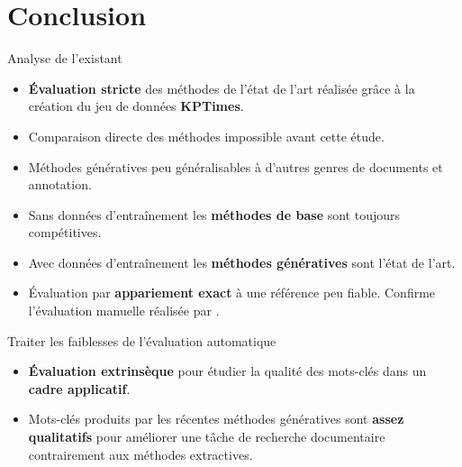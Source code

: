 \section*{Conclusion}

\begin{frame}{}
    \sectionpage
\end{frame}

\begin{frame}{Analyse de l'existant}
    \begin{itemize}
        \item \textbf{\'Evaluation stricte} des méthodes de l'état de l'art réalisée grâce à la création du jeu de données \textbf{KPTimes}.
        \item Comparaison directe des méthodes impossible avant cette étude.
    \end{itemize}
    \begin{itemize}
        \item Méthodes génératives peu généralisables à d'autres genres de documents et annotation.
        \item Sans données d'entraînement les \textbf{méthodes de base} sont toujours compétitives.
        \item Avec données d'entraînement les \textbf{méthodes génératives} sont l'état de l'art.
        \item \'Evaluation par \textbf{appariement exact} à une référence peu fiable. Confirme l'évaluation manuelle réalisée par  \citet{bougouin_indexation_2015}.
    \end{itemize}

\end{frame}

\begin{frame}{Traiter les faiblesses de l'évaluation automatique}
    \begin{itemize}
        \item \textbf{\'Evaluation extrinsèque} pour étudier la qualité des mots-clés dans un \textbf{cadre applicatif}.

        \item Mots-clés produits par les récentes méthodes génératives sont \textbf{assez qualitatifs} pour améliorer une tâche de recherche documentaire contrairement aux méthodes extractives.
    
    \end{itemize}
\end{frame}

